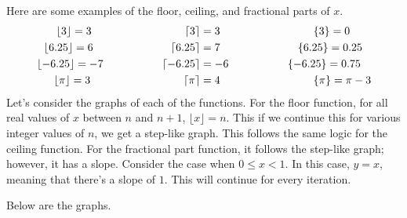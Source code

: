 \documentclass[../book.tex]{subfiles}
\begin{document}
Here are some examples of the floor, ceiling, and fractional parts of $x$.\begin{align*}
    \lfloor{3}\rfloor=3 \hspace{30mm} \lceil{3}\rceil&=3 \hspace{30mm} \{3\}=0 \\
    \lfloor{6.25}\rfloor=6 \hspace{25mm} \lceil{6.25}\rceil&=7 \hspace{25mm} \{6.25\}=0.25 \\
    \lfloor{-6.25}\rfloor=-7 \hspace{19mm} \lceil{-6.25}\rceil&=-6 \hspace{19mm} \{-6.25\}=0.75 \\
    \lfloor{\pi}\rfloor=3 \hspace{30mm} \lceil{\pi}\rceil&=4 \hspace{30mm} \{\pi\}=\pi-3
\end{align*}
Let's consider the graphs of each of the functions.  For the floor function, for all real values of $x$ between $n$ and $n+1$, $\lfloor{x}\rfloor=n$.  This if we continue this for various integer values of $n$, we get a step-like graph. This follows the same logic for the ceiling function.  For the fractional part function, it follows the step-like graph; however, it has a slope.  Consider the case when $0\leq x<1$.  In this case, $y=x$, meaning that there's a slope of $1$.  This will continue for every iteration.

Below are the graphs.
\end{document}
